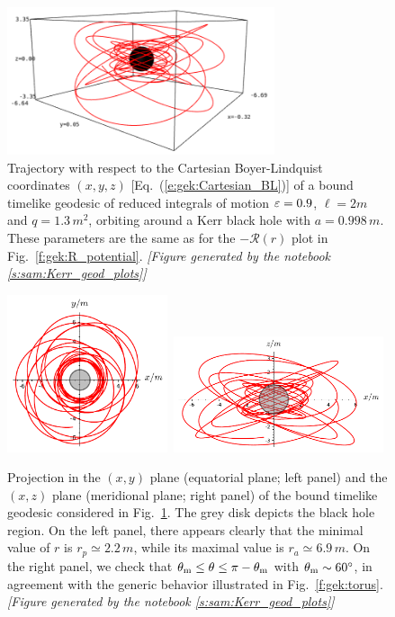 \begin{figure}
\centerline{\includegraphics[width=0.7\textwidth]{gek_timelike_xyz.png}}
\caption[]{\label{f:gek:timelike_xyz} \footnotesize
Trajectory with respect to the Cartesian Boyer-Lindquist coordinates
$(x,y,z)$ [Eq.~(\ref{e:gek:Cartesian_BL})]
of a bound timelike geodesic of reduced integrals of motion
$\varepsilon=0.9$, $\ell=2 m$ and $q=1.3\, m^2$, orbiting around a
Kerr black hole with $a=0.998\, m$. These parameters are the same as for
the $-\mathcal{R}(r)$ plot in Fig.~\ref{f:gek:R_potential}.
\textsl{[Figure generated by the notebook \ref{s:sam:Kerr_geod_plots}]}
}
\end{figure}

\begin{figure}
\centerline{\includegraphics[width=0.42\textwidth]{gek_timelike_xy.pdf}\
\includegraphics[width=0.55\textwidth]{gek_timelike_xz.pdf}
}
\caption[]{\label{f:gek:timelike_plane} \footnotesize
Projection in the $(x,y)$ plane (equatorial plane; left panel) and the $(x,z)$ plane
(meridional plane; right panel)
of the bound timelike geodesic considered in Fig.~\ref{f:gek:timelike_xyz}.
The grey disk depicts the black hole region. On the left panel, there appears
clearly that the minimal value of $r$ is $r_p \simeq 2.2\, m$, while its
maximal value is $r_a \simeq 6.9\, m$. On the right panel, we check
that $\theta_{\rm m} \leq \theta \leq \pi -\theta_{\rm m}$ with
$\theta_{\rm m} \sim 60^\circ$, in agreement with the generic behavior
illustrated in Fig.~\ref{f:gek:torus}.
\textsl{[Figure generated by the notebook \ref{s:sam:Kerr_geod_plots}]}
}
\end{figure}

